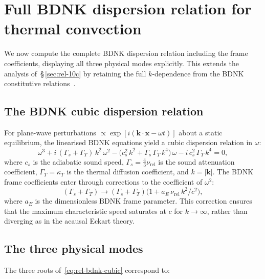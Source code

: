\section{Full BDNK dispersion relation for thermal convection}
\label{sec:rel-12e}

We now compute the complete BDNK dispersion relation including the
frame coefficients, displaying all three physical modes explicitly.
This extends the analysis of~\S\,\ref{sec:rel-10c} by retaining the
full $k$-dependence from the BDNK constitutive
relations~\cite{BemficaDNK2023ideal,HoultKovtun2022}.

\subsection{The BDNK cubic dispersion relation}

For plane-wave perturbations $\propto \exp[i(\mathbf{k}\cdot\mathbf{x}
- \omega t)]$ about a static equilibrium, the linearised BDNK equations
yield a cubic dispersion relation in $\omega$:
\begin{equation}
\label{eq:rel-bdnk-cubic}
\omega^3 + i\,(\Gamma_s + \Gamma_T)\,k^2\,\omega^2
- \bigl(c_s^2\,k^2 + \Gamma_s\,\Gamma_T\,k^4\bigr)\,\omega
- i\,c_s^2\,\Gamma_T\,k^4 = 0,
\end{equation}
where $c_s$ is the adiabatic sound speed,
$\Gamma_s = \frac{4}{3}\nu_{\mathrm{rel}}$ is the sound attenuation
coefficient, $\Gamma_T = \kappa_T$ is the thermal diffusion coefficient,
and $k = |\mathbf{k}|$.  The BDNK frame coefficients enter through
corrections to the coefficient of $\omega^2$:
\begin{equation}
\label{eq:rel-bdnk-frame-correction}
(\Gamma_s + \Gamma_T) \to (\Gamma_s + \Gamma_T)
  \bigl(1 + a_E\,\nu_{\mathrm{rel}}\,k^2/c^2\bigr),
\end{equation}
where $a_E$ is the dimensionless BDNK frame parameter.  This correction
ensures that the maximum characteristic speed saturates at $c$ for
$k \to \infty$, rather than diverging as in the acausal Eckart theory.

\subsection{The three physical modes}

The three roots of~\eqref{eq:rel-bdnk-cubic} correspond to:

